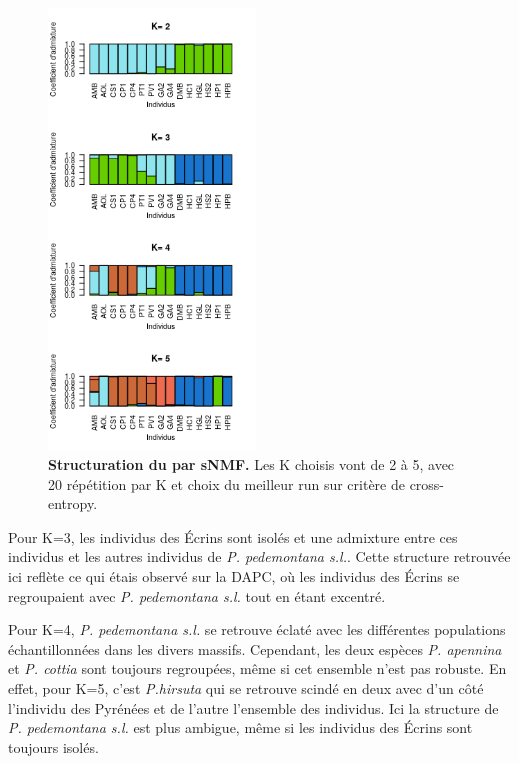 \begin{figure}
	\vspace{-40pt}
	\begin{center}
	\includegraphics[width=0.49\textwidth]{fig/structure_hirsuta.png}
	\end{center}
	\caption{\textbf{Structuration du  par sNMF.} Les K choisis vont de 2 à 5, avec 20 répétition par K et choix du meilleur run sur critère de cross-entropy.}
    \label{structure}
    \vspace{-30pt}
\end{figure}


Pour K=3, les individus des Écrins sont isolés et une admixture entre ces individus et les autres individus de \textit{P. pedemontana s.l.}. Cette structure retrouvée ici reflète ce qui étais observé sur la DAPC, où les individus des Écrins se regroupaient avec \textit{P. pedemontana s.l.} tout en étant excentré.

Pour K=4, \textit{P. pedemontana s.l.} se retrouve éclaté avec les différentes populations échantillonnées dans les divers massifs. Cependant, les deux espèces \textit{P. apennina} et \textit{P. cottia} sont toujours regroupées, même si cet ensemble n'est pas robuste. En effet, pour K=5, c'est \textit{P.hirsuta} qui se retrouve scindé en deux avec d'un côté l'individu des Pyrénées et de l'autre l'ensemble des individus. Ici la structure de \textit{P. pedemontana s.l.} est plus ambigue, même si les individus des Écrins sont toujours isolés.

